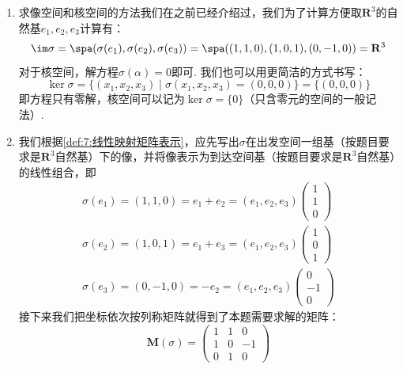 \begin{solution}
    \begin{enumerate}
        \item 求像空间和核空间的方法我们在之前已经介绍过，我们为了计算方便取$\mathbf{R}^3$的自然基$e_1,e_2,e_3$计算有：
              \[\im\sigma=\spa(\sigma(e_1),\sigma(e_2),\sigma(e_3))=\spa((1,1,0),(1,0,1),(0,-1,0))=\mathbf{R}^3\]
              对于核空间，解方程$\sigma(\alpha)=0$即可. 我们也可以用更简洁的方式书写：
              \[\ker\sigma=\{(x_1,x_2,x_3)\mid \sigma(x_1,x_2,x_3)=(0,0,0)\}=\{(0,0,0)\}\]
              即方程只有零解，核空间可以记为$\ker\sigma=\{0\}$（只含零元的空间的一般记法）.

        \item 我们根据\autoref{def:7:线性映射矩阵表示}，应先写出$\sigma$在出发空间一组基（按题目要求是$\mathbf{R}^3$自然基）下的像，并将像表示为到达空间基（按题目要求是$\mathbf{R}^3$自然基）的线性组合，即
              \begin{gather*}
                  \sigma(e_1)=(1,1,0)=e_1+e_2=(e_1,e_2,e_3)\begin{pmatrix}
                      1 \\ 1 \\ 0
                  \end{pmatrix} \\
                  \sigma(e_2)=(1,0,1)=e_1+e_3=(e_1,e_2,e_3)\begin{pmatrix}
                      1 \\ 0 \\ 1
                  \end{pmatrix} \\
                  \sigma(e_3)=(0,-1,0)=-e_2=(e_1,e_2,e_3)\begin{pmatrix}
                      0 \\ -1 \\ 0
                  \end{pmatrix}
              \end{gather*}
              接下来我们把坐标依次按列称矩阵就得到了本题需要求解的矩阵：
              \[\mathbf{M}(\sigma)=\begin{pmatrix}
                      1 & 1 & 0  \\
                      1 & 0 & -1 \\
                      0 & 1 & 0
                  \end{pmatrix}\]
    \end{enumerate}
\end{solution}

